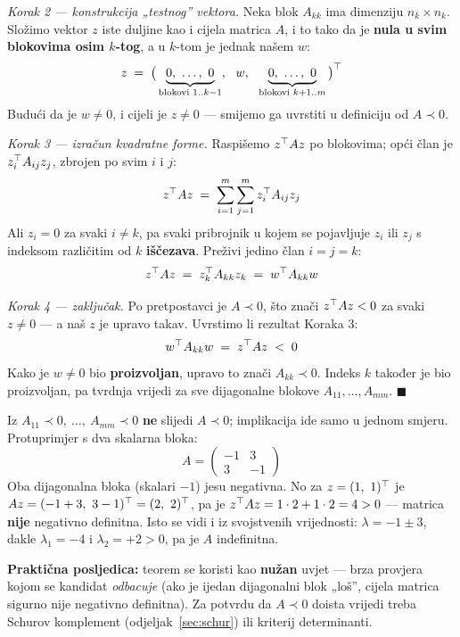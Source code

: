 \emph{Korak 2 --- konstrukcija „testnog” vektora.} Neka blok $A_{kk}$ ima
dimenziju $n_k \times n_k$. Složimo vektor $z$ iste duljine kao i cijela
matrica $A$, i to tako da je \textbf{nula u svim blokovima osim $k$-tog}, a u
$k$-tom je jednak našem $w$:
\[
z \;=\; \big(\underbrace{0,\ \dots,\ 0}_{\text{blokovi } 1..k-1},\ \
   w,\ \ \underbrace{0,\ \dots,\ 0}_{\text{blokovi } k+1..m}\big)\T
\]
Budući da je $w \ne 0$, i cijeli je $z \ne 0$ --- smijemo ga uvrstiti u
definiciju od $A \prec 0$.

\emph{Korak 3 --- izračun kvadratne forme.} Raspišemo $z^{\top} A z$ po blokovima;
opći član je $z_i^{\top} A_{ij} z_j$, zbrojen po svim $i$ i $j$:
\[
z^{\top} A z \;=\; \sum_{i=1}^{m}\sum_{j=1}^{m} z_i^{\top} A_{ij} z_j
\]
Ali $z_i = 0$ za svaki $i \ne k$, pa svaki pribrojnik u kojem se pojavljuje
$z_i$ ili $z_j$ s indeksom različitim od $k$ \textbf{iščezava}. Preživi jedino
član $i = j = k$:
\[
z^{\top} A z \;=\; z_k^{\top} A_{kk} z_k \;=\; w^{\top} A_{kk} w
\]

\emph{Korak 4 --- zaključak.} Po pretpostavci je $A \prec 0$, što znači
$z^{\top} A z < 0$ za svaki $z \ne 0$ --- a naš $z$ je upravo takav. Uvrstimo li
rezultat Koraka 3:
\[
w^{\top} A_{kk} w \;=\; z^{\top} A z \;<\; 0
\]
Kako je $w \ne 0$ bio \textbf{proizvoljan}, upravo to znači $A_{kk} \prec 0$.
Indeks $k$ također je bio proizvoljan, pa tvrdnja vrijedi za sve dijagonalne
blokove $A_{11}, \dots, A_{mm}$. $\blacksquare$

\begin{napomena}
Iz $A_{11} \prec 0,\ \dots,\ A_{mm} \prec 0$ \textbf{ne} slijedi $A \prec 0$;
implikacija ide samo u jednom smjeru. Protuprimjer s dva skalarna bloka:
\[
A = \begin{pmatrix} -1 & 3 \\ 3 & -1 \end{pmatrix}
\]
Oba dijagonalna bloka (skalari $-1$) jesu negativna. No za $z = (1,\ 1)^{\top}$ je
$Az = (-1+3,\ 3-1)^{\top} = (2,\ 2)^{\top}$, pa je
$z^{\top} A z = 1\cdot 2 + 1\cdot 2 = 4 > 0$ --- matrica \textbf{nije} negativno
definitna. Isto se vidi i iz svojstvenih vrijednosti: $\lambda = -1 \pm 3$,
dakle $\lambda_1 = -4$ i $\lambda_2 = +2 > 0$, pa je $A$ indefinitna.

\textbf{Praktična posljedica:} teorem se koristi kao \textbf{nužan} uvjet ---
brza provjera kojom se kandidat \emph{odbacuje} (ako je ijedan dijagonalni
blok „loš”, cijela matrica sigurno nije negativno definitna). Za potvrdu da
$A \prec 0$ doista vrijedi treba Schurov komplement
(odjeljak~\ref{sec:schur}) ili kriterij determinanti.
\end{napomena}

